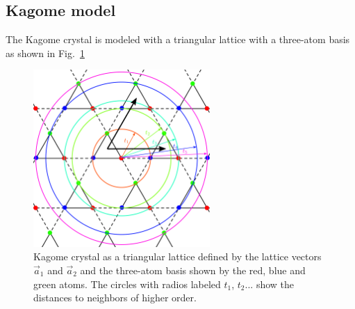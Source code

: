 \subsection{Kagome model}
The Kagome crystal is modeled with a triangular lattice with a three-atom basis as shown in Fig.~\ref{kagome_lat}

\begin{figure}[h!]
\centering
  \includegraphics[width=0.6\textwidth]{artlat/fig/kagome_neighbors.pdf}
\vspace{-5pt}
\caption{Kagome crystal as a triangular lattice defined by the lattice vectors $\vec{a}_1$ and $\vec{a}_2$ and the three-atom basis shown by the red, blue and green atoms. The circles with radios labeled $t_1$, $t_2$... show the distances to neighbors of higher order.}
\label{kagome_lat}
\end{figure}
\FloatBarrier

